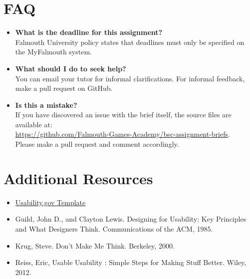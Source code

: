 \documentclass{../../fal_assignment}
\begin{document}
\section*{FAQ}

\begin{itemize}
	\item 	\textbf{What is the deadline for this assignment?} \\ 
    		Falmouth University policy states that deadlines must only be specified on the MyFalmouth system.
    		
	\item 	\textbf{What should I do to seek help?} \\ 
    		You can email your tutor for informal clarifications. For informal feedback, make a pull request on GitHub. 
    		
    	\item 	\textbf{Is this a mistake?} \\ 	
    		If you have discovered an issue with the brief itself, the source files are available at: \\
    		\url{https://github.com/Falmouth-Games-Academy/bsc-assignment-briefs}.\\
    		 Please make a pull request and comment accordingly.
\end{itemize}

\section*{Additional Resources}
\begin{itemize}
    \item \href{https://www.usability.gov/how-to-and-tools/resources/templates/report-template-usability-test.html}{Usability.gov Template}
    \item Guild, John D., and Clayton Lewis. Designing for Usability: Key Principles and What Designers Think. Communications of the ACM, 1985.
    \item Krug, Steve. Don't Make Me Think. Berkeley, 2000. 
    \item Reiss, Eric, Usable Usability : Simple Steps for Making Stuff Better. Wiley, 2012.
\end{itemize}

\rubricyeartwo
\end{document}
